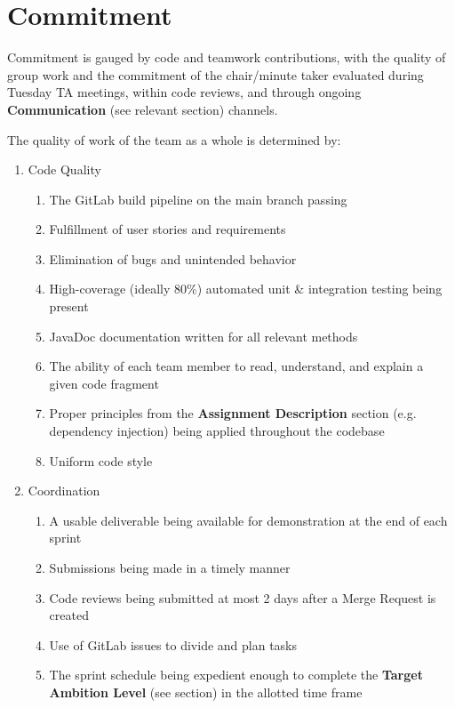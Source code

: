 \section{Commitment}
Commitment is gauged by code and teamwork contributions, with the quality of group work and the commitment of the chair/minute taker evaluated during Tuesday TA meetings, within code reviews, and through ongoing \textbf{Communication} (see relevant section) channels.\par
The quality of work of the team as a whole is determined by:
\begin{enumerate}
    \item Code Quality
    \begin{enumerate}
        \item The GitLab build pipeline on the main branch passing
        \item Fulfillment of user stories and requirements
        \item Elimination of bugs and unintended behavior
        \item High-coverage (ideally 80\%) automated unit \& integration testing being present
        \item JavaDoc documentation written for all relevant methods
        \item The ability of each team member to read, understand, and explain a given code fragment
        \item Proper principles from the \textbf{Assignment Description} section (e.g. dependency injection) being applied throughout the codebase
        \item Uniform code style
    \end{enumerate}
    \item Coordination
    \begin{enumerate}
        \item A usable deliverable being available for demonstration at the end of each sprint
        \item Submissions being made in a timely manner
        \item Code reviews being submitted at most 2 days after a Merge Request is created
        \item Use of GitLab issues to divide and plan tasks
        \item The sprint schedule being expedient enough to complete the \textbf{Target Ambition Level} (see section) in the allotted time frame
    \end{enumerate}
\end{enumerate}\par
